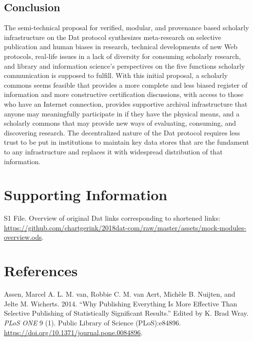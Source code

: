 \documentclass[a4paper]{article}
\begin{document}
\hypertarget{conclusion}{%
\subsection{Conclusion}\label{conclusion}}

The semi-technical proposal for verified, modular, and provenance based
scholarly infrastructure on the Dat protocol synthesizes meta-research
on selective publication and human biases in research, technical
developments of new Web protocols, real-life issues in a lack of
diversity for consuming scholarly research, and library and information
science's perspectives on the five functions scholarly communication is
supposed to fulfill. With this initial proposal, a scholarly commons
seems feasible that provides a more complete and less biased register of
information and more constructive certification discussions, with access
to those who have an Internet connection, provides supportive archival
infrastructure that anyone may meaningfully participate in if they have
the physical means, and a scholarly commons that may provide new ways of
evaluating, consuming, and discovering research. The decentralized
nature of the Dat protocol requires less trust to be put in institutions
to maintain key data stores that are the fundament to any infrastructure
and replaces it with widespread distribution of that information.

\hypertarget{supporting-information}{%
\section{Supporting Information}\label{supporting-information}}

S1 File. Overview of original Dat links corresponding to shortened
links:
\url{https://github.com/chartgerink/2018dat-com/raw/master/assets/mock-modules-overview.ods}.

\hypertarget{references}{%
\section*{References}\label{references}}

\hypertarget{refs}{}
\leavevmode\hypertarget{ref-doi:10.1371ux2fjournal.pone.0084896}{}%
Assen, Marcel A. L. M. van, Robbie C. M. van Aert, Michèle B. Nuijten,
and Jelte M. Wicherts. 2014. ``Why Publishing Everything Is More
Effective Than Selective Publishing of Statistically Significant
Results.'' Edited by K. Brad Wray. \emph{PLoS ONE} 9 (1). Public Library
of Science (PLoS):e84896.
\url{https://doi.org/10.1371/journal.pone.0084896}.
\end{document}
